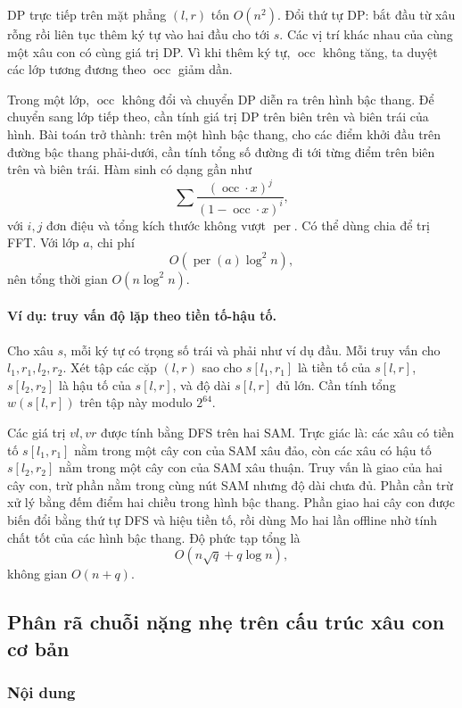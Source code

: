 \documentclass[11pt]{article}
\begin{document}
DP trực tiếp trên mặt phẳng \((l,r)\) tốn \(O(n^2)\). Đổi thứ tự DP: bắt đầu
từ xâu rỗng rồi liên tục thêm ký tự vào hai đầu cho tới \(s\). Các vị trí khác
nhau của cùng một xâu con có cùng giá trị DP. Vì khi thêm ký tự,
\(\operatorname{occ}\) không tăng, ta duyệt các lớp tương đương theo
\(\operatorname{occ}\) giảm dần.

Trong một lớp, \(\operatorname{occ}\) không đổi và chuyển DP diễn ra trên hình
bậc thang. Để chuyển sang lớp tiếp theo, cần tính giá trị DP trên biên trên và
biên trái của hình. Bài toán trở thành: trên một hình bậc thang, cho các điểm
khởi đầu trên đường bậc thang phải-dưới, cần tính tổng số đường đi tới từng
điểm trên biên trên và biên trái. Hàm sinh có dạng gần như
\[
  \sum \frac{(\operatorname{occ}\cdot x)^j}{(1-\operatorname{occ}\cdot x)^i},
\]
với \(i,j\) đơn điệu và tổng kích thước không vượt \(\operatorname{per}\). Có
thể dùng chia để trị FFT. Với lớp \(a\), chi phí
\[
  O(\operatorname{per}(a)\log^2 n),
\]
nên tổng thời gian \(O(n\log^2 n)\).

\paragraph{Ví dụ: truy vấn độ lặp theo tiền tố-hậu tố.}
Cho xâu \(s\), mỗi ký tự có trọng số trái và phải như ví dụ đầu. Mỗi truy vấn
cho \(l_1,r_1,l_2,r_2\). Xét tập các cặp \((l,r)\) sao cho \(s[l_1,r_1]\) là
tiền tố của \(s[l,r]\), \(s[l_2,r_2]\) là hậu tố của \(s[l,r]\), và độ dài
\(s[l,r]\) đủ lớn. Cần tính tổng \(w(s[l,r])\) trên tập này modulo \(2^{64}\).

Các giá trị \(vl,vr\) được tính bằng DFS trên hai SAM. Trực giác là: các xâu
có tiền tố \(s[l_1,r_1]\) nằm trong một cây con của SAM xâu đảo, còn các xâu
có hậu tố \(s[l_2,r_2]\) nằm trong một cây con của SAM xâu thuận. Truy vấn là
giao của hai cây con, trừ phần nằm trong cùng nút SAM nhưng độ dài chưa đủ.
Phần cần trừ xử lý bằng đếm điểm hai chiều trong hình bậc thang. Phần giao hai
cây con được biến đổi bằng thứ tự DFS và hiệu tiền tố, rồi dùng Mo hai lần
offline nhờ tính chất tốt của các hình bậc thang. Độ phức tạp tổng là
\[
  O(n\sqrt q+q\log n),
\]
không gian \(O(n+q)\).

\subsection{Phân rã chuỗi nặng nhẹ trên cấu trúc xâu con cơ bản}

\subsubsection{Nội dung}
\end{document}
